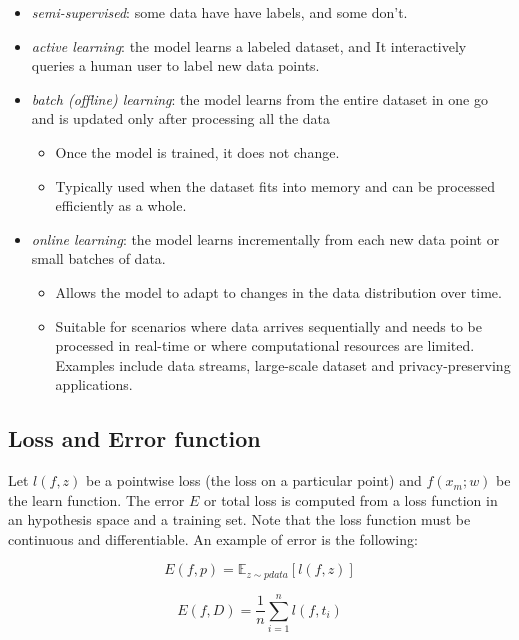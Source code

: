 \documentclass{article}
\begin{document}
\begin{itemize}
\item
  \emph{semi-supervised}: some data have have labels, and some don't.
\item
  \emph{active learning}: the model learns a labeled dataset, and It
  interactively queries a human user to label new data points.
\item
  \emph{batch (offline) learning}: the model learns from the entire
  dataset in one go and is updated only after processing all the data

  \begin{itemize}
  \tightlist
  \item
    Once the model is trained, it does not change.
  \item
    Typically used when the dataset fits into memory and can be
    processed efficiently as a whole.
  \end{itemize}
\item
  \emph{online learning}: the model learns incrementally from each new
  data point or small batches of data.

  \begin{itemize}
  \tightlist
  \item
    Allows the model to adapt to changes in the data distribution over
    time.
  \item
    Suitable for scenarios where data arrives sequentially and needs to
    be processed in real-time or where computational resources are
    limited. Examples include data streams, large-scale dataset and
    privacy-preserving applications.
  \end{itemize}
\end{itemize}

\subsection{Loss and Error function}\label{loss-and-error-function}

Let \(l(f, z)\) be a pointwise loss (the loss on a particular point) and
\(f(x_m ;
w)\) be the learn function. The error \(E\) or total loss is computed
from a loss function in an hypothesis space and a training set. Note
that the loss function must be continuous and differentiable. An example
of error is the following:

\[E(f, p) = \mathbb{E}_{z\sim pdata} [l(f, z)]\]

\[E(f, D) = \frac{1}{n}\sum_{i=1}^{n}l(f, t_i)\]
\end{document}
